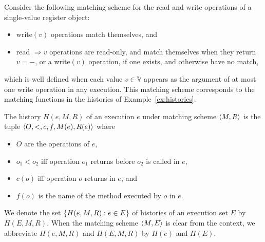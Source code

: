 \begin{example}
  \label{ex:matching}

  Consider the following matching scheme for the read and write operations of
  a single-value register object:
  \begin{itemize}

    \item write$(v)$ operations match themselves, and

    \item read $\Rightarrow v$ operations are read-only, and match themselves
    when they return $v = -$, or a write$(v)$ operation, if one
    exists, and otherwise have no match,

  \end{itemize}
  which is well defined when each value $v \in \mathbb{V}$ appears as the
  argument of at most one write operation in any execution. This matching
  scheme corresponds to the matching functions in the histories of
  Example~\ref{ex:histories}.

\end{example}

The history $H(e,M,R)$ of an execution $e$ under matching scheme ${\left\langle{M,R}\right\rangle}$ is
the tuple ${\left\langle{O,<,c,f,M(e),R(e)}\right\rangle}$ where
\begin{itemize}

  \item $O$ are the operations of $e$,

  \item $o_1 < o_2$ if{f} operation $o_1$ returns before $o_2$ is called in $e$,

  \item $c(o)$ if{f} operation $o$ returns in $e$, and

  \item $f(o)$ is the name of the method executed by $o$ in $e$.

\end{itemize}
We denote the set ${\{{H(e,M,R) : e \in E}\}}$ of histories of an execution set
$E$ by $H(E,M,R)$. When the matching scheme ${\left\langle{M,E}\right\rangle}$ is clear from the
context, we abbreviate $H(e,M,R)$ and $H(E,M,R)$ by $H(e)$ and $H(E)$.

